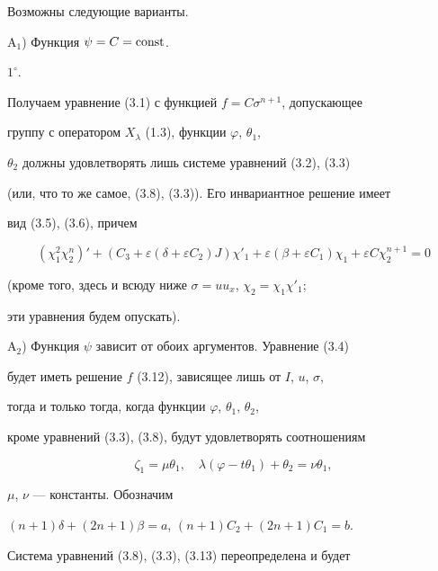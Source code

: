Возможны следующие варианты. 


 


A$_1$) Функция $\psi=C=\operatorname{const}$. 


 


$1^\circ$.


Получаем уравнение (3.1) с функцией $f=C\sigma^{n+1}$, допускающее 


группу с оператором $X_\lambda$ (1.3), функции $\varphi$, $\theta_1$, 


$\theta_2$ должны удовлетворять лишь системе уравнений (3.2), (3.3) 


(или, что то же самое, (3.8), (3.3)). Его инвариантное решение имеет 


вид (3.5), (3.6), причем 


$$ 


(\chi^2_1\chi^n_2)'+(C_3+\varepsilon(\delta+\varepsilon C_2)J) 


\chi'_1+\varepsilon(\beta+\varepsilon C_1)\chi_1+ 


\varepsilon C\chi^{n+1}_2=0 


$$ 


(кроме того, здесь и всюду ниже $\sigma=uu_x$, $\chi_2=\chi_1\chi'_1$; 


эти уравнения будем опускать). 


 


A$_2$) Функция $\psi$ зависит от обоих аргументов. Уравнение (3.4) 


будет иметь решение $f$ (3.12), зависящее лишь от $I$, $u$, $\sigma$, 


тогда и только тогда, когда функции $\varphi$, $\theta_1$, $\theta_2$, 


кроме уравнений (3.3), (3.8), будут удовлетворять соотношениям 


\begin{equation} 


\zeta_1=\mu\theta_1,\quad \lambda(\varphi-t\theta_1) 


+\theta_2=\nu\theta_1, \tag{3.13} 


\end{equation} 


$\mu$, $\nu$ --- константы. Обозначим 


$(n+1)\delta+(2n+1)\beta=a$, $(n+1)C_2+(2n+1)C_1=b$. 


Система уравнений (3.8), (3.3), (3.13) переопределена и будет 


